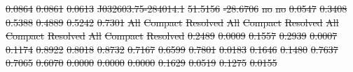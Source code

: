 \documentclass[11pt, a4paper]{book}
\providecommand{\DIFdeltex}[1]{{\protect\color{red}\sout{#1}}}                      %
\providecommand{\DIFdel}[1]{\texorpdfstring{\DIFdeltex{#1}}{}} %
\begin{document}
\DIFdel{0.0864 }%
\DIFdel{0.0861 }%
\DIFdel{0.0613 }%
\DIFdel{J032603.75-284014.1 }%
\DIFdel{51.5156 }%
\DIFdel{-28.6706 }%
\DIFdel{no }%
\DIFdel{no }%
\DIFdel{0.0547 }%
\DIFdel{0.3408 }%
\DIFdel{0.5388 }%
\DIFdel{0.4889 }%
\DIFdel{0.5242 }%
\DIFdel{0.7301 }%
\DIFdel{All }%
\DIFdel{Compact }%
\DIFdel{Resolved }%
\DIFdel{All }%
\DIFdel{Compact }%
\DIFdel{Resolved }%
\DIFdel{All }%
\DIFdel{Compact }%
\DIFdel{Resolved }%
\DIFdel{All }%
\DIFdel{Compact }%
\DIFdel{Resolved }%
\DIFdel{0.2489 }%
\DIFdel{0.0009 }%
\DIFdel{0.1557 }%
\DIFdel{0.2939 }%
\DIFdel{0.0007 }%
\DIFdel{0.1174 }%
\DIFdel{0.8922 }%
\DIFdel{0.8018 }%
\DIFdel{0.8732 }%
\DIFdel{0.7167 }%
\DIFdel{0.6599 }%
\DIFdel{0.7801 }%
\DIFdel{0.0183 }%
\DIFdel{0.1646 }%
\DIFdel{0.1480 }%
\DIFdel{0.7637 }%
\DIFdel{0.7065 }%
\DIFdel{0.6070 }%
\DIFdel{0.0000 }%
\DIFdel{0.0000 }%
\DIFdel{0.0000 }%
\DIFdel{0.1629 }%
\DIFdel{0.0519 }%
\DIFdel{0.1275 }%
\DIFdel{0.0155 }%
\end{document}
